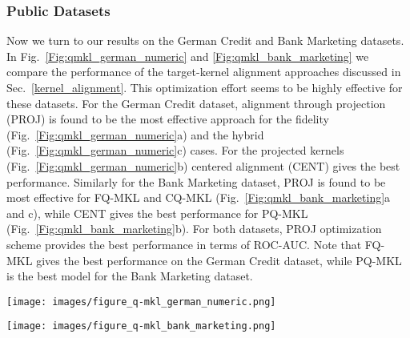 \documentclass[reprint,amsfonts, amssymb, amsmath,  showkeys, nofootinbib,pra, superscriptaddress, twocolumn,longbibliography]{revtex4-2}
\begin{document}
\subsubsection{Public Datasets}

Now we turn to our results on the German Credit and Bank Marketing datasets.
In Fig.~\ref{Fig:qmkl_german_numeric} and \ref{Fig:qmkl_bank_marketing} we compare the performance of the target-kernel alignment approaches discussed in Sec.~\ref{kernel_alignment}.
This optimization effort seems to be highly effective for these datasets. 
For the German Credit dataset, alignment through projection (PROJ) is found to be the most effective approach for the fidelity (Fig.~\ref{Fig:qmkl_german_numeric}a) and the hybrid (Fig.~\ref{Fig:qmkl_german_numeric}c) cases. For the projected kernels (Fig.~\ref{Fig:qmkl_german_numeric}b) centered alignment (CENT) gives the best performance.
Similarly for the Bank Marketing dataset, PROJ is found to be most effective for FQ-MKL and CQ-MKL (Fig.~\ref{Fig:qmkl_bank_marketing}a and c), while CENT gives the best performance for PQ-MKL (Fig.~\ref{Fig:qmkl_bank_marketing}b).
For both datasets, PROJ optimization scheme provides the best performance in terms of ROC-AUC. Note that FQ-MKL gives the best performance on the German Credit dataset, while PQ-MKL is the best model for the Bank Marketing dataset.

\begin{figure*}
\centering
    \texttt{[image: images/figure\_q-mkl\_german\_numeric.png]}
    \caption{\label{Fig:qmkl_german_numeric} 
     We plot the average test ROC-AUC for the German numeric dataset. The results are plotted for different number of qubits, n qubits, or feature dimensions. Kernel weights $w_i$ are optimized in four different ways (AVE, PROJ, SDP and CENT). All result are averaged over the 20 samples. The results of (a) fidelity (FQ-MKL), (b) projected (PQ-MKL) and (c) hybrid (CQ-MKL) kernels are plotted.
    }
\end{figure*}

\begin{figure*}
\centering
    \texttt{[image: images/figure\_q-mkl\_bank\_marketing.png]}
    \caption{\label{Fig:qmkl_bank_marketing} 
     We plot the average test ROC-AUC for the Bank Marketing dataset. The results are plotted for different number of qubits, n qubits, or feature dimensions. Kernel weights $w_i$ are optimized in four different ways (AVE, PROJ, SDP and CENT). All result are averaged over the 20 samples. The results of (a) fidelity (FQ-MKL), (b) projected (PQ-MKL) and (c) hybrid (CQ-MKL) kernels are plotted.
    }
\end{figure*}
\end{document}
